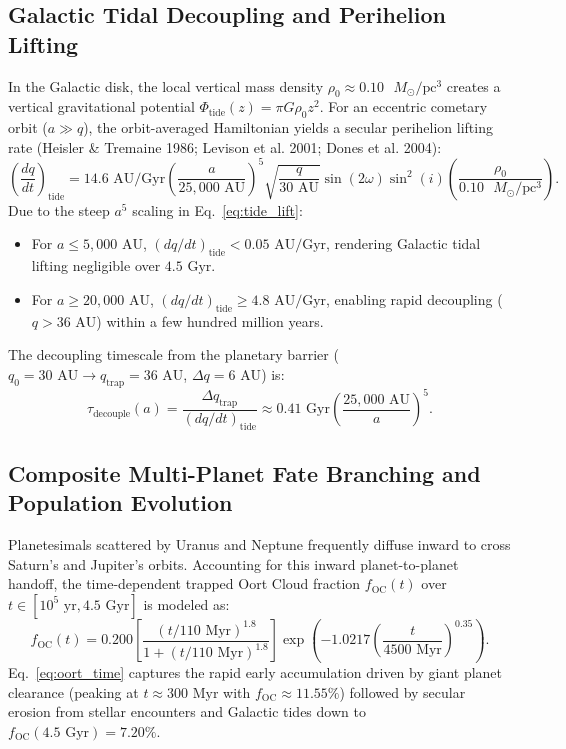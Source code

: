\documentclass[11pt,a4paper]{article}
\begin{document}
\subsection{Galactic Tidal Decoupling and Perihelion Lifting}
In the Galactic disk, the local vertical mass density $\rho_0 \approx 0.10\text{ }M_\odot/\text{pc}^3$ creates a vertical gravitational potential $\Phi_{\text{tide}}(z) = \pi G \rho_0 z^2$. For an eccentric cometary orbit ($a \gg q$), the orbit-averaged Hamiltonian yields a secular perihelion lifting rate (Heisler \& Tremaine 1986; Levison et al. 2001; Dones et al. 2004):
\begin{equation}
\left( \frac{dq}{dt} \right)_{\text{tide}} = 14.6\text{ AU/Gyr} \left( \frac{a}{25,000\text{ AU}} \right)^5 \sqrt{\frac{q}{30\text{ AU}}} \sin(2\omega) \sin^2(i) \left( \frac{\rho_0}{0.10\text{ }M_\odot/\text{pc}^3} \right).
\label{eq:tide_lift}
\end{equation}
Due to the steep $a^5$ scaling in Eq.~\eqref{eq:tide_lift}:
\begin{itemize}
    \item For $a \le 5,000\text{ AU}$, $(dq/dt)_{\text{tide}} < 0.05\text{ AU/Gyr}$, rendering Galactic tidal lifting negligible over $4.5\text{ Gyr}$.
    \item For $a \ge 20,000\text{ AU}$, $(dq/dt)_{\text{tide}} \ge 4.8\text{ AU/Gyr}$, enabling rapid decoupling ($q > 36\text{ AU}$) within a few hundred million years.
\end{itemize}
The decoupling timescale from the planetary barrier ($q_0 = 30\text{ AU} \to q_{\text{trap}} = 36\text{ AU}$, $\Delta q = 6\text{ AU}$) is:
\begin{equation}
\tau_{\text{decouple}}(a) = \frac{\Delta q_{\text{trap}}}{(dq/dt)_{\text{tide}}} \approx 0.41\text{ Gyr} \left( \frac{25,000\text{ AU}}{a} \right)^5.
\end{equation}

\subsection{Composite Multi-Planet Fate Branching and Population Evolution}
Planetesimals scattered by Uranus and Neptune frequently diffuse inward to cross Saturn's and Jupiter's orbits. Accounting for this inward planet-to-planet handoff, the time-dependent trapped Oort Cloud fraction $f_{\text{OC}}(t)$ over $t \in [10^5\text{ yr}, 4.5\text{ Gyr}]$ is modeled as:
\begin{equation}
f_{\text{OC}}(t) = 0.200 \left[ \frac{(t / 110\text{ Myr})^{1.8}}{1 + (t / 110\text{ Myr})^{1.8}} \right] \exp\left( -1.0217 \left( \frac{t}{4500\text{ Myr}} \right)^{0.35} \right).
\label{eq:oort_time}
\end{equation}
Eq.~\eqref{eq:oort_time} captures the rapid early accumulation driven by giant planet clearance (peaking at $t \approx 300\text{ Myr}$ with $f_{\text{OC}} \approx 11.55\%$) followed by secular erosion from stellar encounters and Galactic tides down to $f_{\text{OC}}(4.5\text{ Gyr}) = 7.20\%$.
\end{document}
